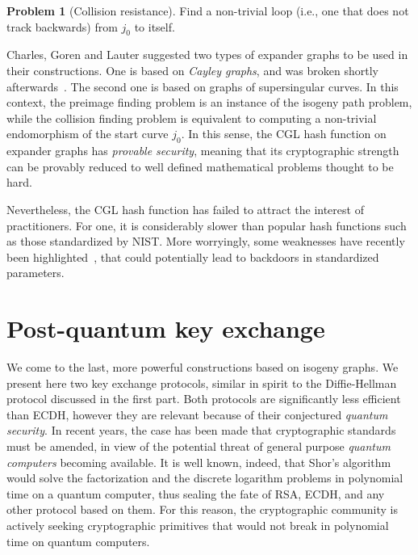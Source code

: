 \documentclass[10pt]{article}
\theoremstyle{plain}
\theoremstyle{definition}
\newtheorem{problem}{Problem}
\begin{document}
\begin{problem}[Collision resistance]
  Find a non-trivial loop (i.e., one that does not track backwards)
  from $j_0$ to itself.
\end{problem}

Charles, Goren and Lauter suggested two types of expander graphs to be
used in their constructions. %
One is based on \emph{Cayley graphs}, and was broken shortly
afterwards~\cite{tillich2008collisions,quis}. %
The second one is based on graphs of supersingular curves. %
In this context, the preimage finding problem is an instance of the
isogeny path problem, while the collision finding problem is
equivalent to computing a non-trivial endomorphism of the start curve
$j_0$. %
In this sense, the CGL hash function on expander graphs has
\emph{provable security}, meaning that its cryptographic strength can
be provably reduced to well defined mathematical problems thought to
be hard.

Nevertheless, the CGL hash function has failed to attract the interest
of practitioners. %
For one, it is considerably slower than popular hash functions such as
those standardized by NIST. %
More worryingly, some weaknesses have recently been
highlighted~\cite{kohel2014quaternion}, that could potentially lead to
backdoors in standardized parameters.


\section{Post-quantum key exchange}
\label{sec:post-quantum-key}

We come to the last, more powerful constructions based on isogeny
graphs. %
We present here two key exchange protocols, similar in spirit to the
Diffie-Hellman protocol discussed in the first part. %
Both protocols are significantly less efficient than ECDH, however
they are relevant because of their conjectured \emph{quantum
  security}. %
In recent years, the case has been made that cryptographic standards
must be amended, in view of the potential threat of general purpose
\emph{quantum computers} becoming available. %
It is well known, indeed, that Shor's
algorithm~\cite{shor1994algorithms} would solve the factorization and
the discrete logarithm problems in polynomial time on a quantum
computer, thus sealing the fate of RSA, ECDH, and any other protocol
based on them. %
For this reason, the cryptographic community is actively seeking
cryptographic primitives that would not break in polynomial time on
quantum computers.
\end{document}
